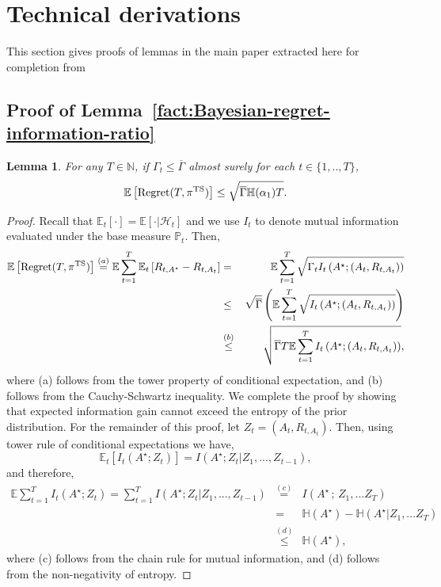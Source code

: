 \documentclass[10pt]{article}
\newtheorem{lemma}[thm]{Lemma}
\def\hist{\mathcal{H}_{t}}
\def\E{\mathbb{E}}
\def\H{\mathbb{H}}
\newcommand{\Prob}{\mathbb{P}}
\begin{document}
\section{Technical derivations}
\label{sec:Proofs}

This section gives proofs of lemmas in the main paper extracted here for completion from ~\citep{russo2016information}


\subsection{Proof of Lemma~\ref{fact:Bayesian-regret-information-ratio}}

\begin{lemma}\label{prop: regret bound}
For any $T\in \mathbb{N}$, if $\Gamma_t \leq \overline{\Gamma}$ almost surely for each $t \in \{1,..,T\}$,  
$$\E \left[{\rm Regret}(T, \pi^{\rm TS})  \right] \leq  \sqrt{\overline{\Gamma} \H(\alpha_1) T}.$$
\end{lemma}
\begin{proof} Recall that $\E_{t}[\cdot] = \E[\cdot | \hist]$ and we use $I_{t}$ to denote mutual information evaluated under the base measure $\Prob_{t}$. Then,
\begin{eqnarray*}
\E \left[{\rm Regret}(T, \pi^{\rm TS})  \right] \overset{(a)}{=} \mathbb{E} \sum_{t=1}^{T} \E_{t} \left[ R_{t, A^\star} -R_{t,A_t} \right]  &=& \mathbb{E}\sum_{t=1}^{T} \sqrt{\Gamma_{t} I_{t}\left( A^\star ; (A_t, R_{t, A_t})  \right)} \\ 
&\leq& \sqrt{\overline{\Gamma}}\left( \mathbb{E} \sum_{t=1}^{T} \sqrt{I_{t}\left( A^\star ; (A_t, R_{t, A_t})  \right)} \right) \\
&\overset{(b)}{\leq}& \sqrt{\overline{\Gamma}T \mathbb{E} \sum_{t=1}^{T} I_{t}\left( A^\star ; (A_t, R_{t, A_t})  \right)},
\end{eqnarray*}
where (a) follows from the tower property of conditional expectation, and (b) follows from the Cauchy-Schwartz inequality. We complete the proof by showing that expected information gain cannot exceed the entropy of the prior distribution. For the remainder of this proof, let $Z_t = (A_t, R_{t,A_t})$. Then, using tower rule of conditional expectations we have,
\[
 {\E_{t}}\left[ I_{t}\left( A^\star ;Z_t \right) \right] =  I\left( A^\star ; Z_t | Z_1,...,Z_{t-1}  \right),
\]
and therefore,
\begin{eqnarray*}
\mathbb{E}\sum_{t=1}^{T} I_{t}\left( A^\star ; Z_t  \right) =  \sum_{t=1}^{T} I\left( A^\star ; Z_t | Z_1,...,Z_{t-1}  \right)
&\overset{(c)}{=}&  I\left(A^\star \, ;\,  Z_1,...Z_{T}    \right) \\ 
&=& \H(A^\star) - \H(A^\star | Z_1,...Z_{T}) \\
&\overset{(d)}{\leq}&  \H(A^\star),
\end{eqnarray*}
where (c) follows from the chain rule for mutual information, and (d) follows from the non-negativity of entropy.
\end{proof}
\end{document}
